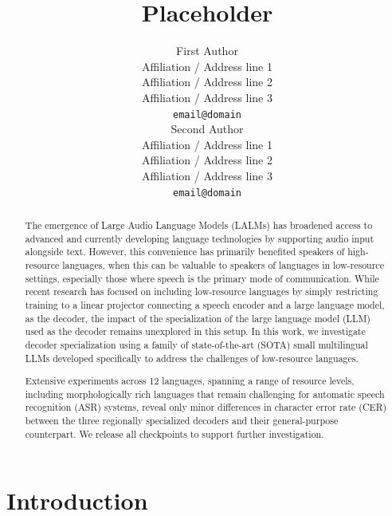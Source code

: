 \documentclass[11pt]{article}
\title{Placeholder}
\author{First Author \\
  Affiliation / Address line 1 \\
  Affiliation / Address line 2 \\
  Affiliation / Address line 3 \\
  \texttt{email@domain} \\\And
  Second Author \\
  Affiliation / Address line 1 \\
  Affiliation / Address line 2 \\
  Affiliation / Address line 3 \\
  \texttt{email@domain} \\}
\begin{document}
\maketitle
\begin{abstract}
The emergence of Large Audio Language Models (LALMs) has broadened access to advanced and currently developing language technologies by supporting audio input alongside text. However, this convenience has primarily benefited speakers of high-resource languages, when this can be valuable to speakers of languages in low-resource settings, especially those where speech is the primary mode of communication. While recent research has focused on including low-resource languages by simply restricting training to a linear projector connecting a speech encoder and a large language model, as the decoder, the impact of the specialization of the large language model (LLM) used as the decoder remains unexplored in this setup. In this work, we investigate decoder specialization using a family of state-of-the-art (SOTA) small multilingual LLMs developed specifically to address the challenges of low-resource languages.

Extensive experiments across 12 languages, spanning a range of resource levels, including morphologically rich languages that remain challenging for automatic speech recognition (ASR) systems, reveal only minor differences in character error rate (CER) between the three regionally specialized decoders and their general-purpose counterpart. We release all checkpoints to support further investigation.

\end{abstract}

\section{Introduction}
\end{document}
